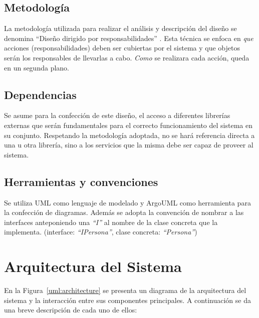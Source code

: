 \documentclass[a4paper,10pt]{article}
\begin{document}
  \subsection{Metodolog\'ia}
  La metodolog\'ia utilizada para realizar el an\'alisis y descripci\'on del
dise\~no se denomina ``Dise\~no dirigido por responsabilidades''
\cite{wirfsbrok03}. Esta t\'ecnica se enfoca en \textit{que} acciones
(responsabilidades) deben ser cubiertas por el sistema y que objetos ser\'an los
responsables de llevarlas a cabo. \textit{Como} se realizara cada acci\'on,
queda en un segunda plano.

  \subsection{Dependencias}
  Se asume para la confecci\'on de este dise\~no, el acceso a diferentes
librer\'ias externas que ser\'an fundamentales para el correcto funcionamiento
del sistema en su conjunto.
  Respetando la metodolog\'ia adoptada, no se har\'a referencia directa a una u
otra librer\'ia, sino a los servicios que la misma debe ser capaz de proveer al
sistema.

  \subsection{Herramientas y convenciones}
  Se utiliza UML\cite{uml} como lenguaje de modelado y ArgoUML\cite{argoUML}
como herramienta para la confecci\'on de diagramas. Adem\'as se adopta la
convenci\'on de nombrar a las interfaces anteponiendo una \textit{``I''} al
nombre de la clase concreta que la implementa. (interface:
\textit{``IPersona''}, clase concreta: \textit{``Persona''})

\section{Arquitectura del Sistema}
  \label{architecture}
  En la Figura~\ref{uml:architecture} se presenta un diagrama de la
arquitectura del sistema y la interacci\'on entre sus componentes principales.
A continuaci\'on se da una breve descripci\'on de cada uno de ellos:
\end{document}
